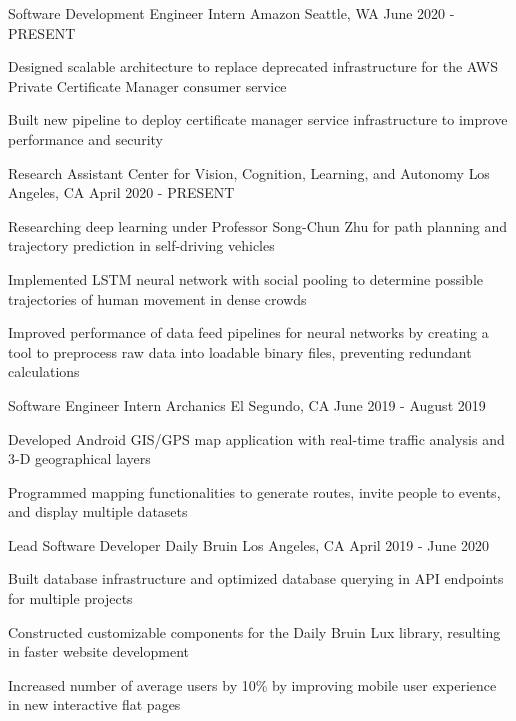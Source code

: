 \documentclass[12pt, letterpaper]{awesome-cv}
\begin{document}
\begin{cventries}
  \cventry
    {Sof\/tware Development Engineer Intern} %
    {Amazon} %
    {Seattle, WA} %
    {June 2020 - PRESENT} %
    {
      \begin{cvitems} %
        \item {Designed scalable architecture to replace deprecated infrastructure for the AWS Private Certificate Manager consumer service}
        \item {Built new pipeline to deploy certificate manager service infrastructure to improve performance and security}
      \end{cvitems}
    }

  \cventry
    {Research Assistant} %
    {Center for Vision, Cognition, Learning, and Autonomy} %
    {Los Angeles, CA} %
    {April 2020 - PRESENT} %
    {
      \begin{cvitems} %
        \item {Researching deep learning under Professor Song-Chun Zhu for path planning and trajectory prediction in self-driving vehicles}
        \item {Implemented LSTM neural network with social pooling to determine possible trajectories of human movement in dense crowds}
        \item {Improved performance of data feed pipelines for neural networks by creating a tool to preprocess raw data into loadable binary files, preventing redundant calculations}
      \end{cvitems}
    }

  \cventry
    {Sof\/tware Engineer Intern} %
    {Archanics} %
    {El Segundo, CA} %
    {June 2019 - August 2019} %
    {
      \begin{cvitems} %
        \item {Developed Android GIS/GPS map application with real-time traf\/fic analysis and 3-D geographical layers}
        \item {Programmed mapping functionalities to generate routes, invite people to events, and display multiple datasets}
      \end{cvitems}
    }

  \cventry
    {Lead Sof\/tware Developer} %
    {Daily Bruin} %
    {Los Angeles, CA} %
    {April 2019 - June 2020} %
    {
      \begin{cvitems} %
        \item {Built database infrastructure and optimized database querying in API endpoints for multiple projects}
		    \item {Constructed customizable components for the Daily Bruin Lux library, resulting in faster website development}
		    \item {Increased number of average users by 10\% by improving mobile user experience in new interactive flat pages}
      \end{cvitems}
    }


\end{cventries}
\end{document}
